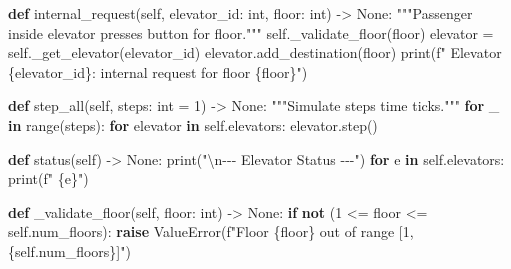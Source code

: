 \documentclass[11pt]{article}
\newenvironment{Shaded}{\begin{snugshade}}{\end{snugshade}}
\newcommand{\BuiltInTok}[1]{\textcolor[rgb]{0.50,0.55,0.55}{#1}}
\newcommand{\CharTok}[1]{\textcolor[rgb]{0.24,0.68,0.91}{#1}}
\newcommand{\CommentTok}[1]{\textcolor[rgb]{0.48,0.49,0.49}{#1}}
\newcommand{\ControlFlowTok}[1]{\textcolor[rgb]{0.99,0.74,0.29}{\textbf{#1}}}
\newcommand{\DecValTok}[1]{\textcolor[rgb]{0.96,0.45,0.00}{#1}}
\newcommand{\KeywordTok}[1]{\textcolor[rgb]{0.81,0.81,0.76}{\textbf{#1}}}
\newcommand{\NormalTok}[1]{\textcolor[rgb]{0.81,0.81,0.76}{#1}}
\newcommand{\OperatorTok}[1]{\textcolor[rgb]{0.81,0.81,0.76}{#1}}
\newcommand{\PreprocessorTok}[1]{\textcolor[rgb]{0.15,0.68,0.38}{#1}}
\newcommand{\SpecialCharTok}[1]{\textcolor[rgb]{0.24,0.68,0.91}{#1}}
\newcommand{\SpecialStringTok}[1]{\textcolor[rgb]{0.85,0.27,0.33}{#1}}
\newcommand{\StringTok}[1]{\textcolor[rgb]{0.96,0.31,0.31}{#1}}
\newcommand{\VariableTok}[1]{\textcolor[rgb]{0.15,0.68,0.68}{#1}}
\begin{document}
\begin{Shaded}
\begin{Highlighting}[]
    \KeywordTok{def}\NormalTok{ internal\_request(}\VariableTok{self}\NormalTok{, elevator\_id: }\BuiltInTok{int}\NormalTok{, floor: }\BuiltInTok{int}\NormalTok{) }\OperatorTok{{-}\textgreater{}} \VariableTok{None}\NormalTok{:}
        \CommentTok{"""Passenger inside elevator presses button for \textasciigrave{}floor\textasciigrave{}."""}
        \VariableTok{self}\NormalTok{.\_validate\_floor(floor)}
\NormalTok{        elevator }\OperatorTok{=} \VariableTok{self}\NormalTok{.\_get\_elevator(elevator\_id)}
\NormalTok{        elevator.add\_destination(floor)}
        \BuiltInTok{print}\NormalTok{(}\SpecialStringTok{f"  Elevator }\SpecialCharTok{\{}\NormalTok{elevator\_id}\SpecialCharTok{\}}\SpecialStringTok{: internal request for floor }\SpecialCharTok{\{}\NormalTok{floor}\SpecialCharTok{\}}\SpecialStringTok{"}\NormalTok{)}

    \KeywordTok{def}\NormalTok{ step\_all(}\VariableTok{self}\NormalTok{, steps: }\BuiltInTok{int} \OperatorTok{=} \DecValTok{1}\NormalTok{) }\OperatorTok{{-}\textgreater{}} \VariableTok{None}\NormalTok{:}
        \CommentTok{"""Simulate \textasciigrave{}steps\textasciigrave{} time ticks."""}
        \ControlFlowTok{for}\NormalTok{ \_ }\KeywordTok{in} \BuiltInTok{range}\NormalTok{(steps):}
            \ControlFlowTok{for}\NormalTok{ elevator }\KeywordTok{in} \VariableTok{self}\NormalTok{.elevators:}
\NormalTok{                elevator.step()}

    \KeywordTok{def}\NormalTok{ status(}\VariableTok{self}\NormalTok{) }\OperatorTok{{-}\textgreater{}} \VariableTok{None}\NormalTok{:}
        \BuiltInTok{print}\NormalTok{(}\StringTok{"}\CharTok{\textbackslash{}n}\StringTok{{-}{-}{-} Elevator Status {-}{-}{-}"}\NormalTok{)}
        \ControlFlowTok{for}\NormalTok{ e }\KeywordTok{in} \VariableTok{self}\NormalTok{.elevators:}
            \BuiltInTok{print}\NormalTok{(}\SpecialStringTok{f"  }\SpecialCharTok{\{}\NormalTok{e}\SpecialCharTok{\}}\SpecialStringTok{"}\NormalTok{)}

    \KeywordTok{def}\NormalTok{ \_validate\_floor(}\VariableTok{self}\NormalTok{, floor: }\BuiltInTok{int}\NormalTok{) }\OperatorTok{{-}\textgreater{}} \VariableTok{None}\NormalTok{:}
        \ControlFlowTok{if} \KeywordTok{not}\NormalTok{ (}\DecValTok{1} \OperatorTok{\textless{}=}\NormalTok{ floor }\OperatorTok{\textless{}=} \VariableTok{self}\NormalTok{.num\_floors):}
            \ControlFlowTok{raise} \PreprocessorTok{ValueError}\NormalTok{(}\SpecialStringTok{f"Floor }\SpecialCharTok{\{}\NormalTok{floor}\SpecialCharTok{\}}\SpecialStringTok{ out of range [1, }\SpecialCharTok{\{}\VariableTok{self}\SpecialCharTok{.}\NormalTok{num\_floors}\SpecialCharTok{\}}\SpecialStringTok{]"}\NormalTok{)}


\end{Highlighting}
\end{Shaded}
\end{document}
